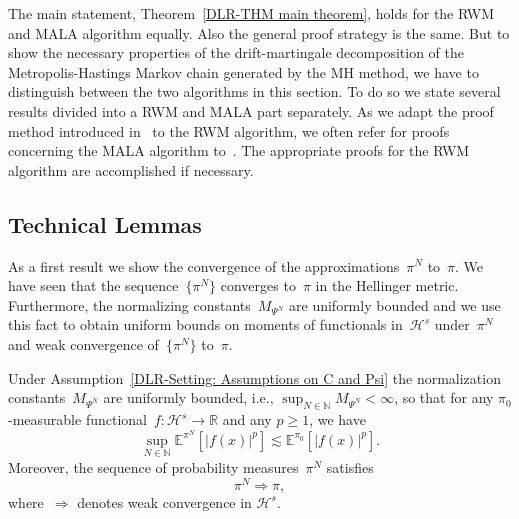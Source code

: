 The main statement, Theorem~\ref{DLR-THM main theorem}, holds for the RWM and MALA algorithm equally. Also the general proof strategy is the same. But to show the necessary properties of the drift-martingale decomposition of the Metropolis-Hastings Markov chain generated by the MH method, we have to distinguish between the two algorithms in this section. To do so we state several results divided into a RWM and MALA part separately. As we adapt the proof method introduced in~\autocite{Pillai2012} to the RWM algorithm, we often refer for proofs concerning the MALA algorithm to~\autocite{Pillai2012}. The appropriate proofs for the RWM algorithm are accomplished if necessary.



\subsection{Technical Lemmas} 
\label{sec:sub: DLR - Tehnical Lemmas}

As a first result we show the convergence of the approximations~$\pi^N$ to~$\pi$. We have seen that the sequence~$\{ \pi^N \}$ converges to~$\pi$ in the Hellinger metric. Furthermore, the normalizing constants~$M_{\Psi^N}$ are uniformly bounded and we use this fact to obtain uniform bounds on moments of functionals in~$\mathcal{H}^s$ under~$\pi^N$ and weak convergence of~$\{ \pi^N \}$ to~$\pi$.

\begin{lemma}\autocite[Lemma 3.5, Lemma 4.3]{Mattingly2010, Pillai2012}
  \label{DLR-Proof: Lemma Convergence of pi^N to pi}
  Under Assumption~\ref{DLR-Setting: Assumptions on C and Psi} the normalization constants~$M_{\Psi^N}$ are uniformly bounded, i.e., $ \sup_{N \in \mathbb{N}} M_{\Psi^N} < \infty$, so that for any $\pi_0$-measurable functional~$f: \mathcal{H}^s \to \mathbb{R}$ and any $p\geq 1$, we have
  \begin{equation*}
    \sup_{N \in \mathbb{N}} \mathbb{E}^{\pi^N} [| f(x) |^p] \lesssim \mathbb{E}^{\pi_0}[|f(x)|^p].
  \end{equation*}
  Moreover, the sequence of probability measures~$\pi^N$ satisfies
  \begin{equation*}
   \pi^N \Longrightarrow \pi,
  \end{equation*}
  where~$\Longrightarrow$ denotes weak convergence in $\mathcal{H}^s$.
 
\end{lemma}

